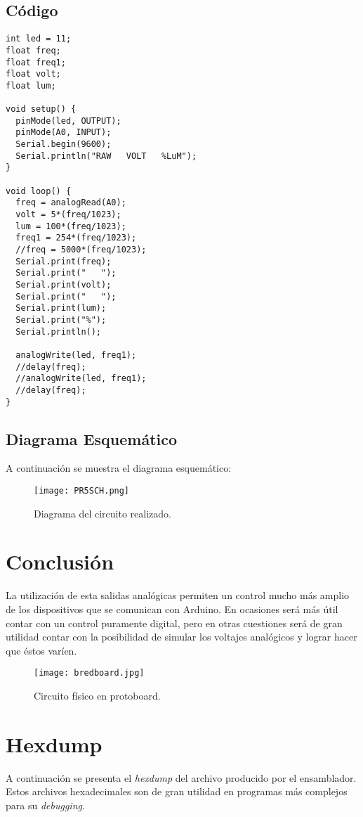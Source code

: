 \documentclass[12pt, letterpaper]{article}
\begin{document}
\subsection*{Código}

\begin{lstlisting}[language=Arduino]
int led = 11;
float freq;
float freq1;
float volt;
float lum;

void setup() {
  pinMode(led, OUTPUT);
  pinMode(A0, INPUT);
  Serial.begin(9600);
  Serial.println("RAW   VOLT   %LuM");
}

void loop() { 
  freq = analogRead(A0);
  volt = 5*(freq/1023);
  lum = 100*(freq/1023);
  freq1 = 254*(freq/1023);
  //freq = 5000*(freq/1023); 
  Serial.print(freq);
  Serial.print("   ");
  Serial.print(volt);
  Serial.print("   ");
  Serial.print(lum);
  Serial.print("%");
  Serial.println();

  analogWrite(led, freq1);
  //delay(freq);
  //analogWrite(led, freq1);
  //delay(freq);
}

\end{lstlisting}

\subsection*{Diagrama Esquemático}

A continuación se muestra el diagrama esquemático:

\begin{figure}[H]
	\centering
	\texttt{[image: PR5SCH.png]}
	\caption{Diagrama del circuito realizado.}
\end{figure}

\section*{Conclusión}
La utilización de esta salidas analógicas permiten un control mucho más amplio de los dispositivos que se comunican con Arduino. En ocasiones será más útil contar con un control puramente digital, pero en otras cuestiones será de gran utilidad contar con la posibilidad de simular los voltajes analógicos y lograr hacer que éstos varíen. 

\begin{figure}[H]
	\centering
	\texttt{[image: bredboard.jpg]}
	\caption{Circuito físico en protoboard.}
\end{figure}

\section*{Hexdump}
A continuación se presenta el \textit{hexdump} del archivo producido por el ensamblador. Estos archivos hexadecimales son de gran utilidad en programas más complejos para su \textit{debugging}.

\scriptsize


\renewcommand\refname{References}
\printbibliography
\end{document}
